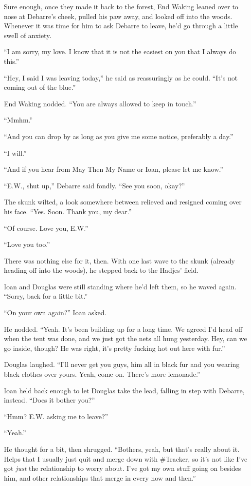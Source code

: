 Sure enough, once they made it back to the forest, End Waking leaned over to nose at Debarre's cheek, pulled his paw away, and looked off into the woods. Whenever it was time for him to ask Debarre to leave, he'd go through a little swell of anxiety.

``I am sorry, my love. I know that it is not the easiest on you that I always do this.''

``Hey, I said I was leaving today,'' he said as reassuringly as he could. ``It's not coming out of the blue.''

End Waking nodded. ``You are always allowed to keep in touch.''

``Mmhm.''

``And you can drop by as long as you give me some notice, preferably a day.''

``I will.''

``And if you hear from May Then My Name or Ioan, please let me know.''

``E.W., shut up,'' Debarre said fondly. ``See you soon, okay?''

The skunk wilted, a look somewhere between relieved and resigned coming over his face. ``Yes. Soon. Thank you, my dear.''

``Of course. Love you, E.W.''

``Love you too.''

There was nothing else for it, then. With one last wave to the skunk (already heading off into the woods), he stepped back to the Hadjes' field.

Ioan and Douglas were still standing where he'd left them, so he waved again. ``Sorry, back for a little bit.''

``On your own again?'' Ioan asked.

He nodded. ``Yeah. It's been building up for a long time. We agreed I'd head off when the tent was done, and we just got the nets all hung yesterday. Hey, can we go inside, though? He was right, it's pretty fucking hot out here with fur.''

Douglas laughed. ``I'll never get you guys, him all in black fur and you wearing black clothes over yours. Yeah, come on. There's more lemonade.''

Ioan held back enough to let Douglas take the lead, falling in step with Debarre, instead. ``Does it bother you?''

``Hmm? E.W. asking me to leave?''

``Yeah.''

He thought for a bit, then shrugged. ``Bothers, yeah, but that's really about it. Helps that I usually just quit and merge down with \#Tracker, so it's not like I've got \emph{just} the relationship to worry about. I've got my own stuff going on besides him, and other relationships that merge in every now and then.''

